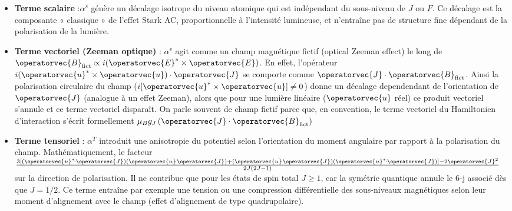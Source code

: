 \begin{itemize}
\item \textbf{Terme scalaire} :$\alpha^s$ génère un décalage isotrope du niveau atomique qui est indépendant du sous-niveau de $J$ ou $F$. Ce décalage est la composante « classique » de l’effet Stark AC, proportionnelle à l’intensité lumineuse, et n’entraîne pas de structure fine dépendant de la polarisation de la lumière.

\item \textbf{Terme vectoriel (Zeeman optique)} : %
$\alpha^v$ agit comme un champ magnétique fictif (optical Zeeman effect) le long de $\operatorvec{B}_{\rm fict}\propto i(\operatorvec{E}^\ast\times \operatorvec{E})$. En effet, l’opérateur $i(\operatorvec{u}^\ast\times\operatorvec{u})\cdot\operatorvec{J}$ se comporte comme $\operatorvec{J}\cdot \operatorvec{B}_{\rm fict}$. Ainsi la polarisation circulaire du champ ($i[\operatorvec{u}^\ast\times\operatorvec{u}]\neq 0$) donne un décalage dependendant de l’orientation de $\operatorvec{J}$ (analogue à un effet Zeeman), alors que pour une lumière linéaire ($\operatorvec{u}$ réel) ce produit vectoriel s’annule et ce terme vectoriel disparaît. On parle souvent de champ fictif parce que, en convention, le terme vectoriel du Hamiltonien d’interaction s’écrit formellement $\mu_B g_J\,(\operatorvec{J}\cdot\operatorvec{B}_{\rm fict})$

\item \textbf{Terme tensoriel} : %
	$\alpha^T$ introduit une anisotropie du potentiel selon l’orientation du moment angulaire par rapport à la polarisation du champ. Mathématiquement, le facteur $\frac{3[(\operatorvec{u}^*\!\cdot \operatorvec{J})(\operatorvec{u}\!\cdot\operatorvec{J})+(\operatorvec{u}\!\cdot\operatorvec{J})(\operatorvec{u}^*\!\cdot \operatorvec{J})]-2\operatorvec{J}^2}{2J(2J-1)}$ sur la direction de polarisation. Il ne contribue que pour les états de spin total $J\geq 1$, car la symétrie quantique annule le 6-j associé dès que $J=1/2$. Ce terme entraîne par exemple une tension ou une compression différentielle des sous-niveaux magnétiques selon leur moment d’alignement avec le champ (effet d’alignement de type quadrupolaire).
\end{itemize}

